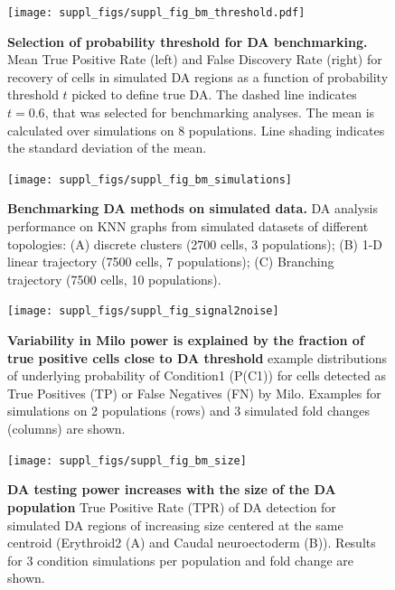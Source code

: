 \documentclass[
]{article}
\begin{document}
\begin{figure}
\centering
\texttt{[image: suppl\_figs/suppl\_fig\_bm\_threshold.pdf]}
\caption{\label{fig:sup-fig-bm-threshold}\textbf{Selection of probability threshold for DA benchmarking.} Mean True Positive Rate (left) and False Discovery Rate (right) for recovery of cells in simulated DA regions as a function of probability threshold \(t\) picked to define true DA. The dashed line indicates \(t = 0.6\), that was selected for benchmarking analyses. The mean is calculated over simulations on 8 populations. Line shading indicates the standard deviation of the mean.}
\end{figure}



\begin{figure}
\texttt{[image: suppl\_figs/suppl\_fig\_bm\_simulations]} \caption{\textbf{Benchmarking DA methods on simulated data.} DA analysis performance on KNN graphs from simulated datasets of different topologies: (A) discrete clusters (2700 cells, 3 populations); (B) 1-D linear trajectory (7500 cells, 7 populations); (C) Branching trajectory (7500 cells, 10 populations).}\label{fig:sup-fig-bm-simulations}
\end{figure}



\begin{figure}
\texttt{[image: suppl\_figs/suppl\_fig\_signal2noise]} \caption{\textbf{Variability in Milo power is explained by the fraction of true positive cells close to DA threshold} example distributions of underlying probability of Condition1 (P(C1)) for cells detected as True Positives (TP) or False Negatives (FN) by Milo. Examples for simulations on 2 populations (rows) and 3 simulated fold changes (columns) are shown.}\label{fig:sup-fig-bm-signal}
\end{figure}



\begin{figure}
\texttt{[image: suppl\_figs/suppl\_fig\_bm\_size]} \caption{\textbf{DA testing power increases with the size of the DA population} True Positive Rate (TPR) of DA detection for simulated DA regions of increasing size centered at the same centroid (Erythroid2 (A) and Caudal neuroectoderm (B)). Results for 3 condition simulations per population and fold change are shown.}\label{fig:sup-fig-bm-size}
\end{figure}
\end{document}
